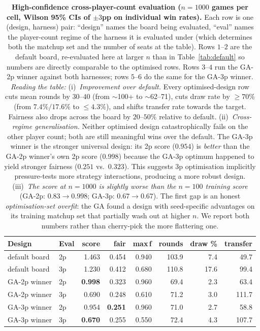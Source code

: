 \documentclass[10pt]{article}
\begin{document}
\begin{table}[h!]
\centering
\small
\begin{tabular}{llrrrrrr}
\toprule
Design & Eval & score & fair & max\,f & rounds & draw \% & transfer \\
\midrule
default board    & 2p & 1.463 & 0.454 & 0.940 & 103.9 &  7.4 &  49.7 \\
default board    & 3p & 1.230 & 0.412 & 0.680 & 110.8 & 17.6 &  99.4 \\
\addlinespace
GA-2p winner     & 2p & \textbf{0.998} & 0.323 & 0.960 &  69.4 & 2.3 &  63.4 \\
GA-2p winner     & 3p & 0.690 & 0.248 & 0.610 &  71.2 & 3.0 & 111.7 \\
\addlinespace
GA-3p winner     & 2p & 0.954 & \textbf{0.251} & 0.960 &  71.0 & 2.7 &  58.8 \\
GA-3p winner     & 3p & \textbf{0.670} & 0.255 & 0.550 &  72.4 & 4.3 & 107.7 \\
\bottomrule
\end{tabular}
\caption{\textbf{High-confidence cross-player-count evaluation
($n{=}1000$ games per cell, Wilson 95\% CIs of $\pm 3$pp on individual
win rates).} Each row is one (design, harness) pair: ``design'' names the
board being evaluated, ``eval'' names the player-count regime of the
harness it is evaluated under (which determines both the matchup set
and the number of seats at the table). Rows $1$--$2$ are the default
board, re-evaluated here at larger $n$ than in Table~\ref{tab:default} so
numbers are directly comparable to the optimised rows. Rows $3$--$4$ run
the GA-2p winner against both harnesses; rows $5$--$6$ do the same for
the GA-3p winner. \emph{Reading the table:}
(i)~\emph{Improvement over default.} Every optimised-design row cuts
mean rounds by $30$--$40$ (from $\sim$100+ to $\sim$62--71),
cuts draw rate by $\geq 70\%$ (from $7.4\%/17.6\%$ to $\leq 4.3\%$),
and shifts transfer rate towards the target. Fairness also drops
across the board by $20$--$50\%$ relative to default.
(ii)~\emph{Cross-regime generalisation.} Neither optimised design
catastrophically fails on the other player count; both are still
meaningful wins over the default. The GA-3p winner is the stronger
universal design: its 2p score ($0.954$) is \emph{better} than the
GA-2p winner's own 2p score ($0.998$) because the GA-3p optimum
happened to yield stronger fairness ($0.251$ vs.\ $0.323$). This
suggests 3p optimisation implicitly pressure-tests more strategy
interactions, producing a more robust design.
(iii)~\emph{The score at $n{=}1000$ is slightly worse than the
$n{=}100$ training score} (GA-2p: $0.83 \to 0.998$; GA-3p:
$0.67 \to 0.67$). The first gap is an honest \emph{optimisation-set
overfit}: the GA found a design with seed-specific advantages on its
training matchup set that partially wash out at higher $n$. We report
both numbers rather than cherry-pick the more flattering one.}
\label{tab:cross}
\end{table}
\end{document}
